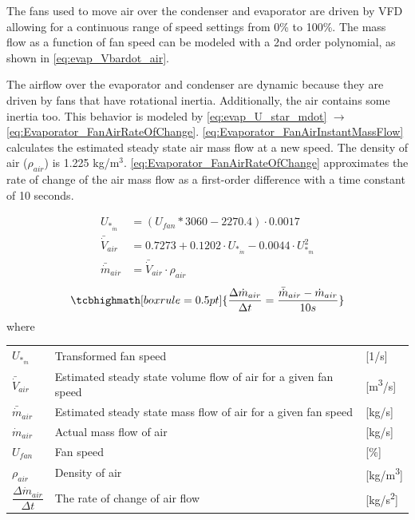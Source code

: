 The fans used to move air over the condenser and evaporator are driven by VFD allowing for a continuous range of speed settings from 0\% to 100\%. The mass flow as a function of fan speed can be modeled with a 2nd order polynomial, as shown in \cref{eq:evap_Vbardot_air}.

The airflow over the evaporator and condenser are dynamic because they are driven by fans that have rotational inertia. Additionally, the air contains some inertia too. This behavior is modeled by \cref{eq:evap_U_star_mdot} $\rightarrow$ \cref{eq:Evaporator_FanAirRateOfChange}. \cref{eq:Evaporator_FanAirInstantMassFlow} calculates the estimated steady state air mass flow at a new speed. The density of air ($\rho_{air}$) is 1.225 \si{kg}/\si{m}$^3$. \cref{eq:Evaporator_FanAirRateOfChange} approximates the rate of change of the air mass flow as a first-order difference with a time constant of 10 seconds.

\begin{align}
	U_{*_{\dot{m}}} & = (U_{fan}*3060 - 2270.4)\cdot 0.0017 \label{eq:evap_U_star_mdot}\\
	\bar{\dot{V}}_{air} & = 0.7273 + 0.1202 \cdot 	U_{*_{\dot{m}}}  -0.0044 \cdot 	U_{*_{\dot{m}}}^2	\label{eq:evap_Vbardot_air} \\
	\bar{\dot{m}}_{air} & = \bar{\dot{V}}_{air} \cdot \rho_{air}	\label{eq:Evaporator_FanAirInstantMassFlow}
\end{align}
\begin{equation}
	\tcbhighmath[boxrule = 0.5pt]{ 	\frac{\Delta \dot{m}_{air}}{\Delta t} = \frac{\bar{\dot{m}}_{air}  - \dot{m}_{air}}{10s}  }  \label{eq:Evaporator_FanAirRateOfChange}
\end{equation}
where

\begin{center}
	\begin{tabular}{l p{8cm} l}
		$ 	U_{*_{\dot{m}}} $ 						& Transformed fan speed												& [1/\si{s}]\\
		$\bar{\dot{V}}_{air}$						& Estimated steady state volume flow of air for a given fan speed 	& [\si{m^3}/\si{s}] \\
		$\bar{\dot{m}}_{air}$						& Estimated steady state mass flow of air for a given fan speed 	& [\si{kg}/\si{s}] \\
		$\dot{m}_{air}$								& Actual mass flow of air					  						& [\si{kg}/\si{s}] \\
		$U_{fan}$									& Fan speed 														& [$\%$] \\
		$\rho_{air}$								& Density of air													& [\si{kg}/\si{m^3}] \\[0.2cm]
		$\dfrac{\Delta \dot{m}_{air}}{\Delta t} $ 	& The rate of change of	air flow 									& [\si{kg}/\si{s^2}]
	\end{tabular}
\end{center}

